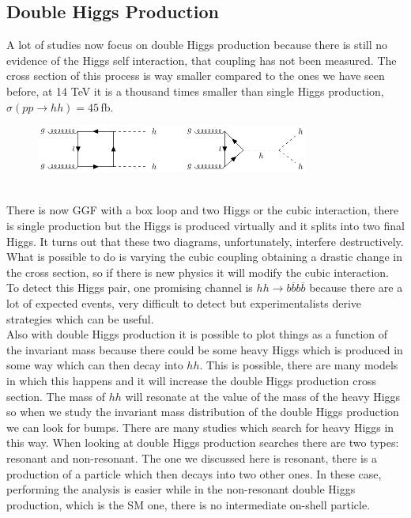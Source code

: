 \documentclass[../main.tex]{subfiles}
\begin{document}
\subsection{Double Higgs Production}
A lot of studies now focus on double Higgs production because there is still no evidence of the Higgs self interaction, that coupling has not been measured. The cross section of this process is way smaller compared to the ones we have seen before, at 14 TeV it is a thousand times smaller than single Higgs production, $\sigma(pp\to hh)=45$\,fb. 
\begin{figure}[h]
    \centering
    \includegraphics[width=0.8\textwidth]{Images/doublehiggsprod.pdf}
    \caption*{}
\end{figure}\\
There is now GGF with a box loop and two Higgs or the cubic interaction, there is single production but the Higgs is produced virtually and it splits into two final Higgs. It turns out that these two diagrams, unfortunately, interfere destructively. What is possible to do is varying the cubic coupling obtaining a drastic change in the cross section, so if there is new physics it will modify the cubic interaction. To detect this Higgs pair, one promising channel is $hh\to b\overline{b}b\overline{b}$ because there are a lot of expected events, very difficult to detect but experimentalists derive strategies which can be useful.\\
Also with double Higgs production it is possible to plot things as a function of the invariant mass because there could be some heavy Higgs which is produced in some way which can then decay into $hh$. This is possible, there are many models in which this happens and it will increase the double Higgs production cross section. The mass of $hh$ will resonate at the value of the mass of the heavy Higgs so when we study the invariant mass distribution of the double Higgs production we can look for bumps. There are many studies which search for heavy Higgs in this way. When looking at double Higgs production searches there are two types: resonant and non-resonant. The one we discussed here is resonant, there is a production of a particle which then decays into two other ones. In these case, performing the analysis is easier while in the non-resonant double Higgs production, which is the SM one, there is no intermediate on-shell particle.  
\end{document}
